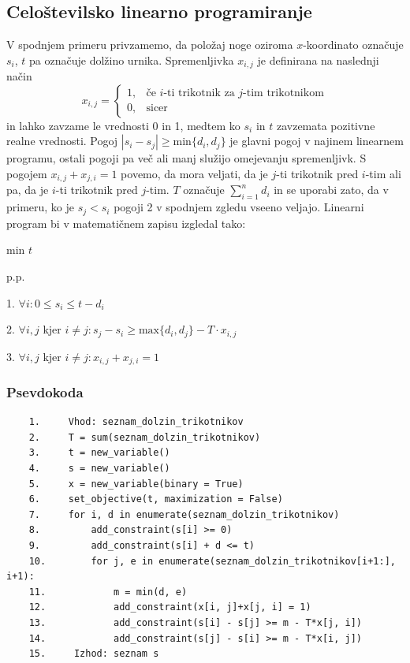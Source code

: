 \documentclass[a4paper,12pt]{article}
\theoremstyle{definition}
\theoremstyle{plain}
\begin{document}
\subsection{Celoštevilsko linearno programiranje}
V spodnjem primeru privzamemo, da položaj noge oziroma $x$-koordinato označuje $s_i$, $t$ pa označuje dolžino urnika. Spremenljivka $x_{i,j}$ je definirana na naslednji način
$$
x_{i,j} =
\left\{
	\begin{array}{ll}
		1,  & \mbox{če } i\text{-ti trikotnik za } j\text{-tim trikotnikom} \\
		0,  & \mbox{sicer } 
	\end{array}
\right.
$$
in lahko zavzame le vrednosti 0 in 1, medtem ko $s_i$ in $t$ zavzemata pozitivne realne vrednosti. Pogoj $|s_i-s_j| \geq \text{min}\{d_i,d_j\}$ je glavni pogoj v najinem linearnem programu, ostali pogoji pa več ali manj služijo omejevanju spremenljivk.
\newpage
S pogojem $x_{i,j}+x_{j,i}=1$ povemo, da mora veljati, da je $j$-ti trikotnik pred $i$-tim ali pa, da je $i$-ti trikotnik pred $j$-tim.
$T$ označuje $\sum_{i=1}^n d_i$ in se uporabi zato, da v primeru, ko je $s_j < s_i$ pogoji 2 v spodnjem zgledu vseeno veljajo.
Linearni program bi v matematičnem zapisu izgledal tako:
\begin{center}
    min $t$

    p.p.

    1.  $\forall i: 0 \leq s_i \leq t-d_i$

    \medskip

    2.  $\forall i,j \text{ kjer } i\neq j: s_j - s_i \geq \text{max}\{d_i,d_j\}-T\cdot x_{i,j}$
    \medskip

    3.  $\forall i,j \text{ kjer } i\neq j: x_{i,j}+x_{j,i}=1$
\end{center}
\subsubsection{Psevdokoda}
\begin{verbatim}
    1.     Vhod: seznam_dolzin_trikotnikov
    2.     T = sum(seznam_dolzin_trikotnikov)
    3.     t = new_variable()
    4.     s = new_variable()
    5.     x = new_variable(binary = True)
    6.     set_objective(t, maximization = False)
    7.     for i, d in enumerate(seznam_dolzin_trikotnikov)
    8.         add_constraint(s[i] >= 0)
    9.         add_constraint(s[i] + d <= t)
    10.        for j, e in enumerate(seznam_dolzin_trikotnikov[i+1:], i+1):
    11.            m = min(d, e)
    12.            add_constraint(x[i, j]+x[j, i] = 1)
    13.            add_constraint(s[i] - s[j] >= m - T*x[j, i])
    14.            add_constraint(s[j] - s[i] >= m - T*x[i, j])
    15.     Izhod: seznam s
\end{verbatim}
\end{document}

